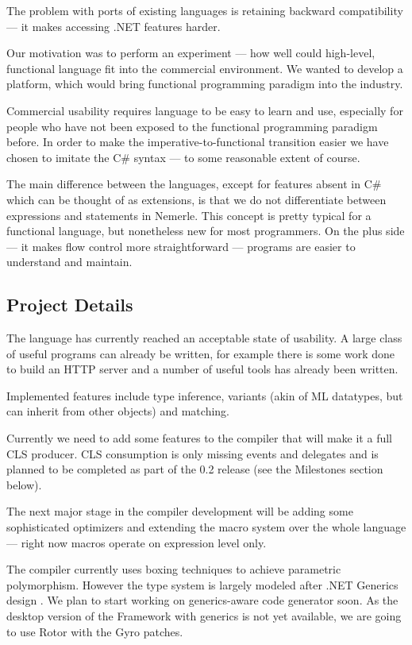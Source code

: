 \documentclass[a4paper,11pt]{article}
\begin{document}
The problem with ports of existing languages is retaining backward
compatibility --- it makes accessing .NET features harder.

Our motivation was to perform an experiment --- how well could high-level,
functional language fit into the commercial environment. We wanted to
develop a platform, which would bring functional programming paradigm
into the industry.

Commercial usability requires language to be easy to learn and
use, especially for people who have not been exposed to the
functional programming paradigm before.  In order to make the
imperative-to-functional transition easier we have chosen to imitate
the C\# syntax --- to some reasonable extent of course.

The main difference between the languages, except for features absent
in C\# which can be thought of as extensions, is that we do not
differentiate between expressions and statements in Nemerle. This
concept is pretty typical for a functional language, but nonetheless
new for most programmers.  On the plus side --- it makes flow control
more straightforward --- programs are easier to understand and maintain.


\subsection{Project Details}

The language has currently reached an acceptable state of usability.
A large class of useful programs can already be written, for example
there is some work done to build an HTTP server and a number of
useful tools has already been written.

Implemented features include type inference, variants (akin of ML
datatypes, but can inherit from other objects) and matching.

Currently we need to add some features to the compiler that will make
it a full CLS producer. CLS consumption is only missing events and
delegates and is planned to be completed as part of the 0.2 release
(see the Milestones section below).

The next major stage in the compiler development will be adding some
sophisticated optimizers and extending the macro system over the whole
language --- right now macros operate on expression level only.

The compiler currently uses boxing techniques to achieve parametric
polymorphism.  However the type system is largely modeled after .NET
Generics design \cite{generics}. We plan to start working on 
generics-aware code generator soon. As the desktop version of 
the Framework with generics is not yet available, we are going
to use Rotor with the Gyro patches.
\end{document}
